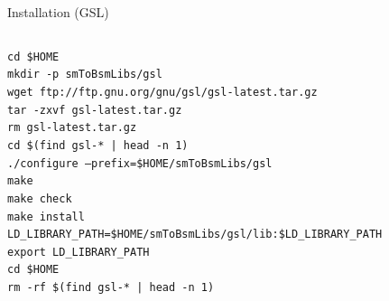 \documentclass[]{beamer}
\begin{document}
\begin{frame}{Installation (GSL)}
  \begin{columns}
    \begin{column}{\textwidth}
      {\tiny
        \begin{tcolorbox}[colback=gray!5!white]
        \texttt{cd \$HOME} \\
        \texttt{mkdir -p smToBsmLibs/gsl} \\
        \texttt{wget ftp://ftp.gnu.org/gnu/gsl/gsl-latest.tar.gz} \\
        \texttt{tar -zxvf gsl-latest.tar.gz} \\
        \texttt{rm gsl-latest.tar.gz} \\
        \texttt{cd \$(find gsl-* | head -n 1)} \\
        \texttt{./configure --prefix=\$HOME/smToBsmLibs/gsl} \\
        \texttt{make} \\
        \texttt{make check} \\
        \texttt{make install} \\
        \texttt{LD\_LIBRARY\_PATH=\$HOME/smToBsmLibs/gsl/lib:\$LD\_LIBRARY\_PATH} \\
        \texttt{export LD\_LIBRARY\_PATH} \\
        \texttt{cd \$HOME} \\
        \texttt{rm -rf \$(find gsl-* | head -n 1)}
      \end{tcolorbox}}
    \end{column}
  \end{columns}
\end{frame}
\end{document}
